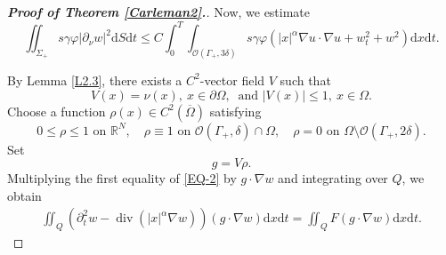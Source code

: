 \documentclass[11pt]{article}
\numberwithin{equation}{section}
\def\pt{\partial}
\def\ol{\overline}
\def\vp{\varphi}
\def\bf{\textbf}
\def\pt{\partial}
\def\Om{\Omega}
\def\al{\alpha}
\def\de{\delta}
\def\ga{\gamma}
\def\Ga{\Gamma}
\def\se{\setminus}
\def\df{\mathrm d}
\def\mcO{\mathcal{O}}
\DeclareMathOperator{\Div}{div}
\newcommand{\R}{\mathbb R}
\begin{document}
\begin{proof}[{\rm \bf { Proof of  Theorem \ref{Carleman2}.}}]
			
			Now, we  estimate
			\begin{equation*}
				\iint_{\Sigma_+}  s\ga \vp  |\pt_\nu w|^2\df S\df t\leq C  \int_0^T\int_{\mcO(\Ga_+,3\de)}   s\ga \vp\left(|x|^\al \nabla u\cdot \nabla u+w_t^2+w^2\right)\df x\df t .
			\end{equation*}
			
			
			
			By Lemma \ref{L2.3}, there exists a $C^2$-vector field $V$ such that
			\begin{equation*}
				V(x)=\nu(x), \ x\in\pt\Om, \ \mbox{ and } |V(x)|\leq 1, \ x\in\Om.
			\end{equation*}
			Choose a function $\rho(x)\in C^2(\ol\Om)$ satisfying
			\begin{equation*}
				0\leq \rho\leq 1 \mbox{ on }\R^N,\quad \rho\equiv 1 \mbox{ on } \mcO(\Ga_+, \de)\cap \Om, \quad \rho=0 \mbox{ on }\Om\se \mcO(\Ga_+, 2\de).
			\end{equation*}
			Set
			\begin{equation*}
				g=V\rho .
			\end{equation*}
			Multiplying the first equality of \eqref{EQ-2} by  $g\cdot \nabla w$ and integrating over  $Q$, we obtain
			\begin{equation*}
				\begin{split}
					\iint_Q\left(\pt_t^2w-\Div(|x|^\al \nabla w)\right) (g\cdot \nabla w)\df x\df t=\iint_Q F(g\cdot \nabla w)\df x\df t.
				\end{split}
			\end{equation*}
			

\end{proof}
\end{document}
